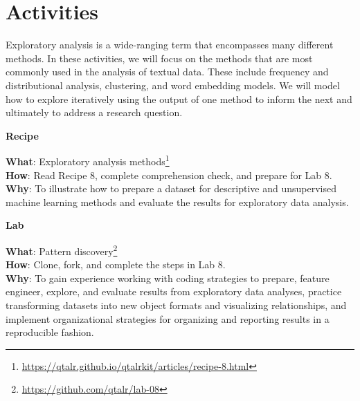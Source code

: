 \documentclass[
  letterpaper,
]{latex/krantz}
\theoremstyle{definition}
\theoremstyle{remark}
\DeclareRobustCommand{\href}[2]{#2\footnote{\url{#1}}}
\begin{document}
\section*{Activities}\label{activities-6}


Exploratory analysis is a wide-ranging term that encompasses many
different methods. In these activities, we will focus on the methods
that are most commonly used in the analysis of textual data. These
include frequency and distributional analysis, clustering, and word
embedding models. We will model how to explore iteratively using the
output of one method to inform the next and ultimately to address a
research question.

\begin{tcolorbox}[enhanced jigsaw, colback=white, colframe=quarto-callout-color-frame, leftrule=.75mm, opacityback=0, rightrule=.15mm, bottomrule=.15mm, toprule=.15mm, breakable, left=2mm, arc=.35mm]

\textbf{ Recipe}

\textbf{What}:
\href{https://qtalr.github.io/qtalrkit/articles/recipe-8.html}{Exploratory
analysis methods}\\
\textbf{How}: Read Recipe 8, complete comprehension check, and prepare
for Lab 8.\\
\textbf{Why}: To illustrate how to prepare a dataset for descriptive and
unsupervised machine learning methods and evaluate the results for
exploratory data analysis.

\end{tcolorbox}

\begin{tcolorbox}[enhanced jigsaw, colback=white, colframe=quarto-callout-color-frame, leftrule=.75mm, opacityback=0, rightrule=.15mm, bottomrule=.15mm, toprule=.15mm, breakable, left=2mm, arc=.35mm]

\textbf{ Lab}

\textbf{What}: \href{https://github.com/qtalr/lab-08}{Pattern
discovery}\\
\textbf{How}: Clone, fork, and complete the steps in Lab 8.\\
\textbf{Why}: To gain experience working with coding strategies to
prepare, feature engineer, explore, and evaluate results from
exploratory data analyses, practice transforming datasets into new
object formats and visualizing relationships, and implement
organizational strategies for organizing and reporting results in a
reproducible fashion.

\end{tcolorbox}
\end{document}
